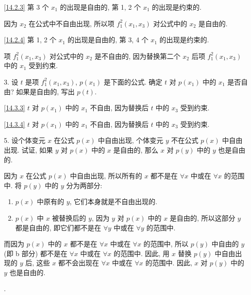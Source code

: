 \documentclass[boxes]{homework}
\begin{document}
\begin{solution}
    \ref{14.2.3} 第 3 个 $x_1$ 的出现是自由的, 第 1, 2 个 $x_1$ 的出现是约束的.

    因为 $x_2$ 在公式中不自由出现, 所以项 $f_1^2(x_1, x_3)$ 对公式中的 $x_2$ 是自由的.

    \ref{14.2.4} 第 1, 2 个 $x_1$ 的出现是自由的, 第 3, 4 个 $x_1$ 的出现是约束的.

    项 $f_1^2(x_1, x_3)$ 对公式中的 $x_2$ 是不自由的, 因为替换第二个 $x_2$ 后项 $f_1^2(x_1, x_3)$ 中的 $x_1$ 受到约束.
\end{solution}

\begin{problem}
3. 设 $t$ 是项 $f_1^2(x_1, x_3)$, $p(x_1)$ 是下面的公式. 确定 $t$ 对 $p(x_1)$ 中的 $x_1$ 是否自由? 如果是自由的, 写出 $p(t)$.
\end{problem}
\begin{solution}
    \ref{14.3.3} $t$ 对 $p(x_1)$ 中的 $x_1$ 不自由, 因为替换后 $t$ 中的 $x_3$ 受到约束.

    \ref{14.3.4} $t$ 对 $p(x_1)$ 中的 $x_1$ 不自由, 因为替换后 $t$ 中的 $x_3$ 受到约束.
\end{solution}
\begin{problem}
5. 设个体变元 $x$ 在公式 $p(x)$ 中自由出现, 个体变元 $y$ 不在公式 $p(x)$ 中自由出现. 试证, 如果 $y$ 对 $p(x)$ 中的 $x$ 是自由的, 那么 $x$ 对 $p(y)$ 中的 $y$ 也是自由的.
\end{problem}
\begin{solution}
    因为 $x$ 在公式 $p(x)$ 中自由出现, 所以所有的 $x$ 都不是在 $\forall x$ 中或在 $\forall x$ 的范围中. 将 $p(y)$ 中的 $y$ 分为两部分:
    \begin{enumerate}[label = (\alph*), itemsep = 0em, topsep = .5em, partopsep = .5em]
        \item $p(x)$ 中原有的 $y$, 它们本身就是不自由出现的.
        \item $p(x)$ 中 $x$ 被替换后的 $y$, 因为 $y$ 对 $p(x)$ 中的 $x$ 是自由的, 所以这部分 $y$ 都是自由的, 即它们都不是在 $\forall y$ 中或在 $\forall y$ 的范围中.
    \end{enumerate}
    而因为 $p(x)$ 中的 $x$ 都不是在 $\forall x$ 中或在 $\forall x$ 的范围中, 所以 $p(y)$ 中自由的 $y$ (即 b 部分) 都不是在 $\forall x$ 中或在 $\forall x$ 的范围中. 因此, 用 $x$ 替换 $p(y)$ 中自由出现的 $y$ 后, 这些 $x$ 都不会出现在 $\forall x$ 中或在 $\forall x$ 的范围中. 因此, $x$ 对 $p(y)$ 中的 $y$ 也是自由的.
\end{solution}.
\end{document}
